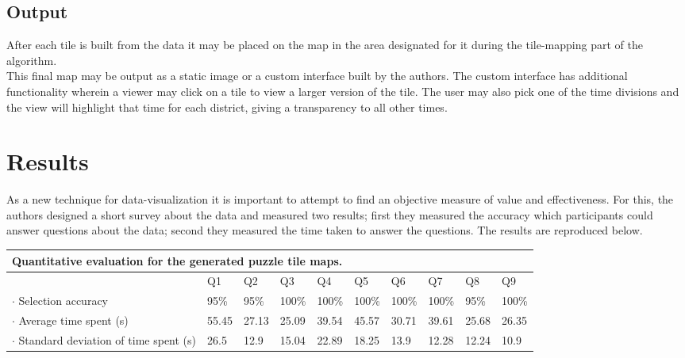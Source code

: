\documentclass[a4paper,man,natbib]{apa6}
\begin{document}
	\subsection{Output}
	After each tile is built from the data it may be placed on the map in the area designated for it during the tile-mapping part of the algorithm. \\
	This final map may be output as a static image or a custom interface built by the authors. The custom interface has additional functionality wherein a viewer may click on a tile to view a larger version of the tile. The user may also pick one of the time divisions and the view will highlight that time for each district, giving a transparency to all other times. \\
	
	\section{Results}
	As a new technique for data-visualization it is important to attempt to find an objective measure of value and effectiveness. For this, the authors designed a short survey about the data and measured two results; first they measured the accuracy which participants could answer questions about the data; second they measured the time taken to answer the questions. The results are reproduced below. \vspace{1em}
		
	\begin{adjustbox}{width=\columnwidth,center}
		\begin{tabular}{l l l l l l l l l l}
			\multicolumn{10}{l}{Quantitative evaluation for the generated puzzle tile maps.} \\
			\hline
			    & Q1 & Q2 & Q3 & Q4 & Q5 & Q6 & Q7 & Q8 & Q9 \\
			\hline
			$\cdot$ Selection accuracy & 95\% & 95\% & 100\% & 100\% & 100\% & 100\% & 100\%  & 95\% & 100\% \\
			$\cdot$ Average time spent (s) & 55.45 & 27.13 & 25.09 & 39.54 & 45.57 & 30.71 & 39.61 & 25.68 & 26.35 \\
			$\cdot$ Standard deviation of time spent (s) & 26.5 & 12.9 & 15.04 & 22.89 & 18.25 & 13.9 & 12.28 & 12.24 & 10.9 \\
			\hline
		\end{tabular} 
	\end{adjustbox} \vspace{1em}
\end{document}
